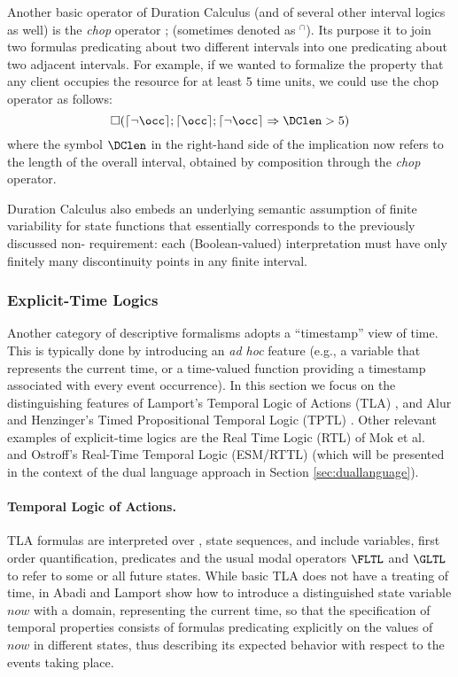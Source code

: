 Another basic operator of Duration Calculus (and of several other 
interval logics as well) is the \emph{chop} operator ; (sometimes denoted as $^\cap$).
Its purpose it to join two formulas predicating 
about two different intervals into one predicating about two 
adjacent intervals. For example, if we wanted to formalize 
the property that any client occupies the resource for at least 
5 time units, we could use the chop operator as follows:
\begin{equation*}
  \Box ( \lceil \neg \occ \rceil ; \lceil \occ \rceil ; \lceil \neg \occ \rceil \Rightarrow \DClen > 5 )
\end{equation*}
where the symbol $\DClen$ in the right-hand side of the implication 
now refers to the length of the overall interval, obtained by 
composition through the \emph{chop} operator.

Duration Calculus also embeds an underlying semantic assumption 
of finite variability for state functions that essentially corresponds 
to the previously discussed non- requirement: each (Boolean-valued) 
interpretation must have only finitely many discontinuity points 
in any finite interval.


\subsubsection{Explicit-Time Logics} \label{sec:logicswtime}
Another category of descriptive formalisms adopts a ``timestamp'' 
 view of time. This is typically done by introducing an \emph{ad hoc}
feature (e.g., a variable that represents the current time, 
or a time-valued function providing a timestamp associated with 
every event occurrence). In this section we focus on the distinguishing 
features of Lamport's Temporal Logic of Actions (TLA) \cite{Lam94}, 
and Alur and Henzinger's Timed Propositional Temporal Logic (TPTL) \cite{AH94}.
Other relevant examples of explicit-time logics are the Real Time Logic (RTL) of Mok et al.~\cite{JM86}
and Ostroff's Real-Time Temporal Logic (ESM/RTTL) \cite{Ost89} (which will be presented in 
the context of the dual language approach in Section \ref{sec:duallanguage}).


\paragraph{Temporal Logic of Actions.}
TLA formulas are interpreted over ,  state sequences, 
and include variables, first order quantification, predicates 
and the usual modal operators $\FLTL$ and $\GLTL$ to refer to some 
or all future states. While basic TLA does not have a  
treating of time, in \cite{AL94} Abadi and Lamport show how to introduce 
a distinguished state variable $now$ with a  domain, representing 
the current time, so that the specification of temporal properties 
consists of formulas predicating explicitly on the values of $now$ 
in different states, thus describing its expected behavior with 
respect to the events taking place.

